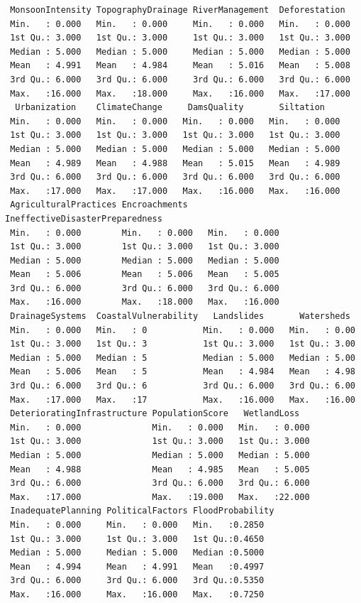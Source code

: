 \documentclass[
  letterpaper,
  DIV=11,
  numbers=noendperiod]{scrartcl}
\begin{document}
\begin{verbatim}
 MonsoonIntensity TopographyDrainage RiverManagement  Deforestation   
 Min.   : 0.000   Min.   : 0.000     Min.   : 0.000   Min.   : 0.000  
 1st Qu.: 3.000   1st Qu.: 3.000     1st Qu.: 3.000   1st Qu.: 3.000  
 Median : 5.000   Median : 5.000     Median : 5.000   Median : 5.000  
 Mean   : 4.991   Mean   : 4.984     Mean   : 5.016   Mean   : 5.008  
 3rd Qu.: 6.000   3rd Qu.: 6.000     3rd Qu.: 6.000   3rd Qu.: 6.000  
 Max.   :16.000   Max.   :18.000     Max.   :16.000   Max.   :17.000  
  Urbanization    ClimateChange     DamsQuality       Siltation     
 Min.   : 0.000   Min.   : 0.000   Min.   : 0.000   Min.   : 0.000  
 1st Qu.: 3.000   1st Qu.: 3.000   1st Qu.: 3.000   1st Qu.: 3.000  
 Median : 5.000   Median : 5.000   Median : 5.000   Median : 5.000  
 Mean   : 4.989   Mean   : 4.988   Mean   : 5.015   Mean   : 4.989  
 3rd Qu.: 6.000   3rd Qu.: 6.000   3rd Qu.: 6.000   3rd Qu.: 6.000  
 Max.   :17.000   Max.   :17.000   Max.   :16.000   Max.   :16.000  
 AgriculturalPractices Encroachments    IneffectiveDisasterPreparedness
 Min.   : 0.000        Min.   : 0.000   Min.   : 0.000                 
 1st Qu.: 3.000        1st Qu.: 3.000   1st Qu.: 3.000                 
 Median : 5.000        Median : 5.000   Median : 5.000                 
 Mean   : 5.006        Mean   : 5.006   Mean   : 5.005                 
 3rd Qu.: 6.000        3rd Qu.: 6.000   3rd Qu.: 6.000                 
 Max.   :16.000        Max.   :18.000   Max.   :16.000                 
 DrainageSystems  CoastalVulnerability   Landslides       Watersheds   
 Min.   : 0.000   Min.   : 0           Min.   : 0.000   Min.   : 0.00  
 1st Qu.: 3.000   1st Qu.: 3           1st Qu.: 3.000   1st Qu.: 3.00  
 Median : 5.000   Median : 5           Median : 5.000   Median : 5.00  
 Mean   : 5.006   Mean   : 5           Mean   : 4.984   Mean   : 4.98  
 3rd Qu.: 6.000   3rd Qu.: 6           3rd Qu.: 6.000   3rd Qu.: 6.00  
 Max.   :17.000   Max.   :17           Max.   :16.000   Max.   :16.00  
 DeterioratingInfrastructure PopulationScore   WetlandLoss    
 Min.   : 0.000              Min.   : 0.000   Min.   : 0.000  
 1st Qu.: 3.000              1st Qu.: 3.000   1st Qu.: 3.000  
 Median : 5.000              Median : 5.000   Median : 5.000  
 Mean   : 4.988              Mean   : 4.985   Mean   : 5.005  
 3rd Qu.: 6.000              3rd Qu.: 6.000   3rd Qu.: 6.000  
 Max.   :17.000              Max.   :19.000   Max.   :22.000  
 InadequatePlanning PoliticalFactors FloodProbability
 Min.   : 0.000     Min.   : 0.000   Min.   :0.2850  
 1st Qu.: 3.000     1st Qu.: 3.000   1st Qu.:0.4650  
 Median : 5.000     Median : 5.000   Median :0.5000  
 Mean   : 4.994     Mean   : 4.991   Mean   :0.4997  
 3rd Qu.: 6.000     3rd Qu.: 6.000   3rd Qu.:0.5350  
 Max.   :16.000     Max.   :16.000   Max.   :0.7250  
\end{verbatim}
\end{document}
